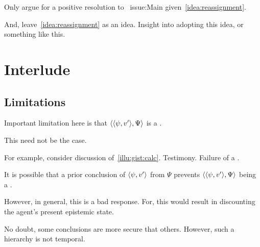 \begin{note}[???]
  Only argue for a positive resolution to~{\color{red} issue:Main} given~\autoref{idea:reassignment}.

  And, leave~\autoref{idea:reassignment} as an idea.
  Insight into adopting this idea, or something like this.
\end{note}

\section{Interlude}
\label{cha:fcs:sec:interlude}

\subsection{Limitations}

\begin{note}
  Important limitation here is that \(\langle \langle \psi, v' \rangle, \Psi \rangle\) is a \requ{}.

  This need not be the case.

  For example, consider discussion of~\autoref{illu:gist:calc}.
  Testimony.
  Failure of a \requ{}.

  It is possible that a prior conclusion of \(\langle \psi, v' \rangle\) from \(\Psi\) prevents \(\langle \langle \psi, v' \rangle, \Psi \rangle\) being a \requ{}.

  However, in general, this is a bad response.
  For, this would result in discounting the agent's present epistemic state.

  No doubt, some conclusions are more secure that others.
  However, such a hierarchy is not temporal.
\end{note}

